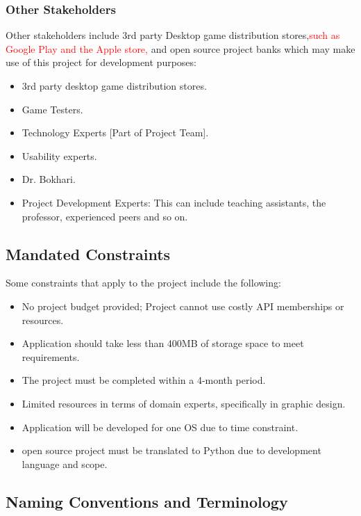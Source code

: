\documentclass[12pt, titlepage]{article}
\begin{document}
\subsubsection{Other Stakeholders}

Other stakeholders include 3rd party Desktop game distribution stores,\textcolor{red}{such as Google Play and the Apple store,} and open source project banks which may make use of this project for development purposes:

\begin{itemize}
\item 3rd party desktop game distribution stores.
\item Game Testers.
\item Technology Experts [Part of Project Team].
\item Usability experts.
\item Dr. Bokhari.
\item Project Development Experts: This can include teaching assistants, the professor, experienced peers and so on.
\end{itemize}


\subsection{Mandated Constraints}

Some constraints that apply to the project include the following:

\begin{itemize}
\item No project budget provided; Project cannot use costly API memberships or resources.
\item Application should take less than 400MB of storage space to meet requirements.
\item The project must be completed within a 4-month period.
\item Limited resources in terms of domain experts, specifically in graphic design.
\item Application will be developed for one OS due to time constraint.
\item open source project must be translated to Python due to development language and scope.
\end{itemize}

\subsection{Naming Conventions and Terminology}
\end{document}
